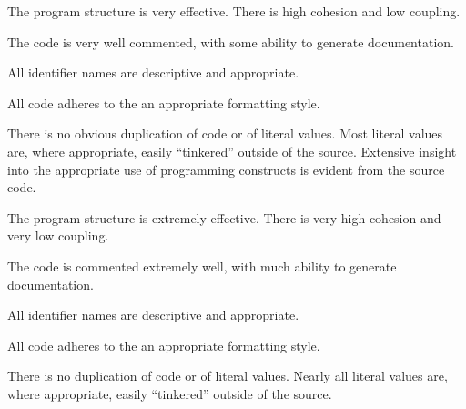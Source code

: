 \documentclass{../../fal_assignment}
\begin{document}
\begin{markingrubric}
            \par The program structure is very effective. There is high cohesion and low coupling.
            \par The code is very well commented, with some ability to generate documentation.
            \par All identifier names are descriptive and appropriate.
            \par All code adheres to the an appropriate formatting style.
             \par There is no obvious duplication of code or of literal values. Most literal values are, where appropriate, easily ``tinkered'' outside of the source.  
        \grade Extensive insight into the appropriate use of programming constructs is evident from the source code.
            \par The program structure is extremely effective. There is very high cohesion and very low coupling.
            \par The code is commented extremely well, with much ability to generate documentation.
            \par All identifier names are descriptive and appropriate.
            \par All code adheres to the an appropriate formatting style.
            \par There is no duplication of code or of literal values. Nearly all literal values are, where appropriate, easily ``tinkered'' outside of the source.  
%
\end{markingrubric}
\end{document}
